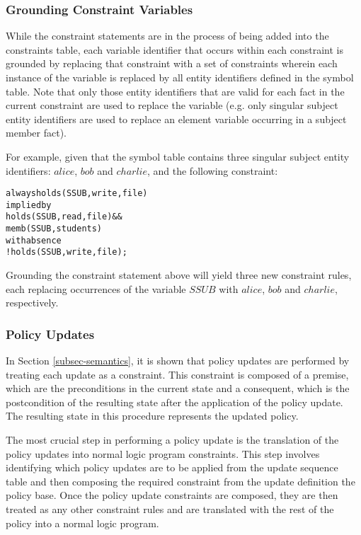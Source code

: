 \documentclass[global,twocolumn,final]{svjour}
\newenvironment{vverbatim}
  {\begin{alltt}}
  {\vspace{-\baselineskip}\end{alltt}}
\begin{document}
      \subsubsection{Grounding Constraint Variables}

        While the constraint statements are in the process of being added into
        the constraints table, each variable identifier that occurs within each
        constraint is grounded by replacing that constraint with a set of
        constraints wherein each instance of the variable is replaced by all
        entity identifiers defined in the symbol table. Note that only those
        entity identifiers that are valid for each fact in the current
        constraint are used to replace the variable (e.g. only singular
        subject entity identifiers are used to replace an element variable
        occurring in a subject member fact).

        For example, given that the symbol table contains three singular
        subject entity identifiers: $alice$, $bob$ and $charlie$, and the
        following constraint:

        \begin{vverbatim}
  always holds(SSUB, write, file)
    implied by
      holds(SSUB, read, file) &&
      memb(SSUB, students)
    with absence
      !holds(SSUB, write, file);
        \end{vverbatim}

        Grounding the constraint statement above will yield three new
        constraint rules, each replacing occurrences of the variable $SSUB$
        with $alice$, $bob$ and $charlie$, respectively.

      \subsubsection{Policy Updates}

        In Section \ref{subsec-semantics}, it is shown that policy updates are
        performed by treating each update as a constraint. This constraint is
        composed of a premise, which are the preconditions in the current state
        and a consequent, which is the postcondition of the resulting state
        after the application of the policy update. The resulting state in this
        procedure represents the updated policy.

        The most crucial step in performing a policy update is the translation
        of the policy updates into normal logic program constraints. This step
        involves identifying which policy updates are to be applied from the
        update sequence table and then composing the required constraint from
        the update definition the policy base. Once the policy update
        constraints are composed, they are then treated as any other
        constraint rules and are translated with the rest of the policy into
        a normal logic program.
\end{document}

